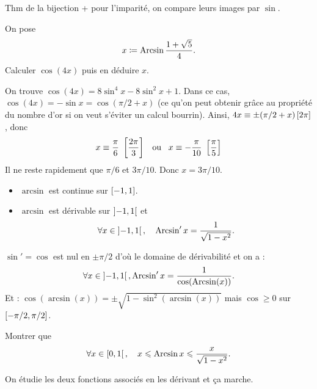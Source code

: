 \documentclass{magnoliaold}
\begin{document}
\begin{preuve}
Thm de la bijection + pour l'imparité, on compare leurs images par $\sin$.
\end{preuve}

\begin{exoUnique}
\exemple On pose
  \[x\coloneqq\operatorname{Arcsin}\frac{1+\sqrt{5}}{4}.\]
  Calculer $\cos(4x)$ puis en déduire $x$.
  \begin{sol}
  On trouve $\cos(4x)=8\sin^4 x-8\sin^2 x+1$. Dans ce cas, $\cos(4x)=-\sin x=\cos(\pi/2+x)$ (ce qu'on peut obtenir grâce au propriété du nombre d'or si on veut s'éviter un calcul bourrin). Ainsi, $4x \equiv \pm(\pi/2+x)\left[2\pi\right]$, donc
  \[x\equiv \frac{\pi}{6}\  \left[\frac{2\pi}{3}\right] \quad\!\text{ou}\quad\!
    x\equiv -\frac{\pi}{10}\ \left[\frac{\pi}{5}\right]\]
  Il ne reste rapidement que $\pi/6$ et $3\pi/10$. Donc $x=3\pi/10$.
  \end{sol}
\end{exoUnique}

\begin{proposition}[utile=-3]
\begin{itemize}
\item $\arcsin$ est continue sur $\left[-1,1\right]$.
\item $\arcsin$ est dérivable sur $\left]-1,1\right[$ et
  \[\forall x\in\left]-1,1\right[ ,\quad \operatorname{Arcsin}' x=\frac{1}{\sqrt{1-x^2}}.\]
\end{itemize}
\end{proposition}

\begin{preuve}
$\sin'=\cos$ est nul en $\pm \pi/2$ d'où le domaine de dérivabilité et on a :
\[\forall x \in \left]-1,1\right[, \operatorname{Arcsin}' x=\frac{1}{\cos(\operatorname{Arcsin}(x))}.\]
Et : $\cos(\arcsin(x))=\pm \sqrt{1-\sin^2(\arcsin(x))}$ mais $\cos\geq0$ sur $\left[-\pi/2,\pi/2\right]$.
\end{preuve}
\begin{exoUnique}
\exemple Montrer que
  \[\forall x\in\left[0,1\right[ ,\quad x\leqslant\operatorname{Arcsin} x\leqslant\frac{x}{\sqrt{1-x^2}}.\]
  \begin{sol}
  On étudie les deux fonctions associés en les dérivant et ça marche.
  \end{sol}
\end{exoUnique}
\end{document}
